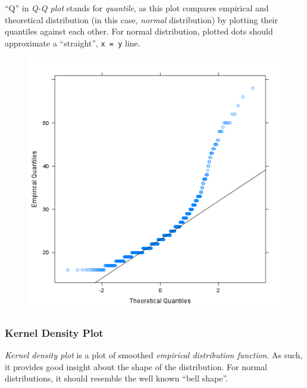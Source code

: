 \documentclass{article}
\makeatletter
\def\maxwidth{\ifdim\Gin@nat@width>\linewidth\linewidth
\else\Gin@nat@width\fi}
\let\Oldincludegraphics\includegraphics
\renewcommand{\includegraphics}[1]{\Oldincludegraphics[width=\maxwidth]{#1}}
\makeatother
\begin{document}
``Q'' in \emph{Q-Q plot} stands for \emph{quantile}, as this plot
compares empirical and theoretical distribution (in this case,
\emph{normal} distribution) by plotting their quantiles against each
other. For normal distribution, plotted dots should approximate a
``straight'', \texttt{x = y} line.

\begin{figure}[htbp]
\centering
\includegraphics{cbbba756d844aa053998959b73b9feff.png}
\caption{}
\end{figure}

\subsubsection{Kernel Density Plot}

\emph{Kernel density plot} is a plot of smoothed \emph{empirical
distribution function}. As such, it provides good insight about the
shape of the distribution. For normal distributions, it should resemble
the well known ``bell shape''.
\end{document}
